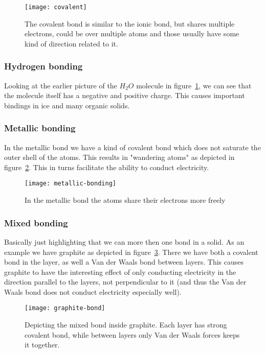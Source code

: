 \documentclass[11pt]{article}
\begin{document}
\begin{figure}[!ht]
	\centering
	\texttt{[image: covalent]}
	\caption{The covalent bond is similar to the ionic bond, but shares multiple electrons, could be over multiple atoms and those usually have some kind of direction related to it.}
	\label{fig:covalent}
\end{figure}

\subsubsection{Hydrogen bonding}
Looking at the earlier picture of the $H_2O$ molecule in figure~\ref{fig:covalent}, we can see that the molecule itself has a negative and positive charge. This causes important bindings in ice and many organic solids.

\newpage
\subsubsection{Metallic bonding}
In the metallic bond we have a kind of covalent bond which does not saturate the outer shell of the atoms. This results in "wandering atoms" as depicted in figure~\ref{fig:metallic-bonding}. This in turns facilitate the ability to conduct electricity. 
\begin{figure}[!ht]
	\centering
	\texttt{[image: metallic-bonding]}
	\caption{In the metallic bond the atoms share their electrons more freely}
	\label{fig:metallic-bonding}
\end{figure}

\newpage
\subsubsection{Mixed bonding}
Basically just highlighting that we can more then one bond in a solid. As an example we have graphite as depicted in figure~\ref{fig:graphite-bond}. There we have both a covalent bond in the layer, as well a Van der Waals bond between layers. This causes graphite to have the interesting effect of only conducting electricity in the direction parallel to the layers, not perpendicular to it (and thus the Van der Waals bond does not conduct electricity especially well).
\begin{figure}[!ht]
	\centering
	\texttt{[image: graphite-bond]}
	\caption{Depicting the mixed bond inside graphite. Each layer has strong covalent bond, while between layers only Van der Waals forces keeps it together.}
	\label{fig:graphite-bond}
\end{figure}
\newpage 
\end{document}
